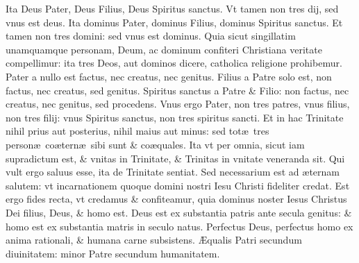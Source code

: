 \documentclass[a5paper,10pt]{book}
\def\ae{æ}
\def\AE{Æ}
\begin{document}
\begin{multicols*}{2}
\newline \color{red} I\color{black}ta Deus Pater, Deus Filius, Deus Spiritus sanctus.
\newline \color{red} V\color{black}t tamen non tres dij, sed vnus est deus.
\newline \color{red} I\color{black}ta dominus Pater, dominus Filius, dominus Spiritus sanctus.
\newline \color{red} E\color{black}t tamen non tres domini: sed vnus est dominus.
\newline \color{red} Q\color{black}uia sicut singillatim unamquamque personam, Deum, ac dominum confiteri Christiana veritate compellimur: ita tres Deos, aut dominos dicere, catholica religione prohibemur.%
\newline \color{red} P\color{black}ater a nullo est factus, nec creatus, nec genitus.
\newline \color{red} F\color{black}ilius a Patre solo est, non factus, nec creatus, sed genitus.
\newline \color{red} S\color{black}piritus sanctus a Patre \& Filio: non factus, nec creatus, nec genitus, sed procedens.
\newline \color{red} V\color{black}nus ergo Pater, non tres patres, vnus filius, non tres filij: vnus Spiritus sanctus, non tres spiritus sancti.
\newline \color{red} E\color{black}t in hac Trinitate nihil prius aut posterius, nihil maius aut minus: sed tot\ae \ tres person\ae \ co\ae tern\ae \ sibi sunt \& co\ae quales.
\newline \color{red} I\color{black}ta vt per omnia, sicut iam supradictum est, \& vnitas in Trinitate, \& Trinitas in vnitate veneranda sit.
\newline \color{red} Q\color{black}ui vult ergo saluus esse, ita de Trinitate sentiat.
\newline \color{red} S\color{black}ed necessarium est ad \ae ternam salutem: vt incarnationem quoque domini nostri Iesu Christi fideliter credat.
\newline \color{red} E\color{black}st ergo fides recta, vt credamus \& confiteamur, quia dominus noster Iesus Christus Dei filius, Deus, \& homo est.
\newline \color{red} D\color{black}eus est ex substantia patris ante secula genitus: \& homo est ex substantia matris in seculo natus.
\newline \color{red} P\color{black}erfectus Deus, perfectus homo ex anima rationali, \& humana carne subsistens.
\newline \color{red} \AE \color{black}qualis Patri secundum diuinitatem: minor Patre secundum humanitatem.

\end{multicols*}
\end{document}
